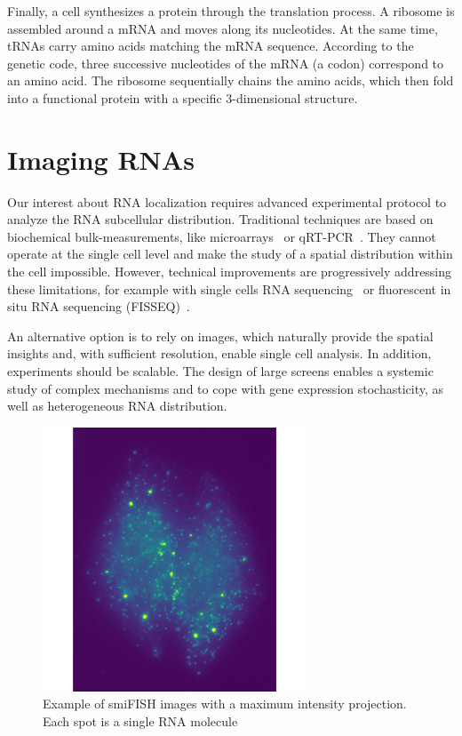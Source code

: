 Finally, a cell synthesizes a protein through the translation process.
A ribosome is assembled around a \ac{mRNA} and moves along its nucleotides.
At the same time, \ac{tRNA}s carry amino acids matching the \ac{mRNA} sequence.
According to the genetic code, three successive nucleotides of the \ac{mRNA} (a codon) correspond to an amino acid.
The ribosome sequentially chains the amino acids, which then fold into a functional protein with a specific 3-dimensional structure.

\section{Imaging RNAs}
\label{sec:fish}

Our interest about \ac{RNA} localization requires advanced experimental protocol to analyze the \ac{RNA} subcellular distribution.
Traditional techniques are based on biochemical bulk-measurements, like microarrays~\cite{Schena_1995} or qRT-PCR~\cite{bustin_absolute_2000}.
They cannot operate at the single cell level and make the study of a spatial distribution within the cell impossible.
However, technical improvements are progressively addressing these limitations, for example with single cells \ac{RNA} sequencing~\cite{Hedlund_2018} or fluorescent in situ \ac{RNA} sequencing (FISSEQ)~\cite{Church_2014}.

An alternative option is to rely on images, which naturally provide the spatial insights and, with sufficient resolution, enable single cell analysis.
In addition, experiments should be scalable.
The design of large screens enables a systemic study of complex mechanisms and to cope with gene expression stochasticity, as well as heterogeneous \ac{RNA} distribution.

\begin{figure}[]
    \centering
    \includegraphics[width=0.7\textwidth]{figures/introduction/multichannel_input}
	\caption[Example of smiFISH image]{Example of smiFISH images with a maximum intensity projection.
	Each spot is a single RNA molecule}
    \label{fig:smFISH_input}
\end{figure}

